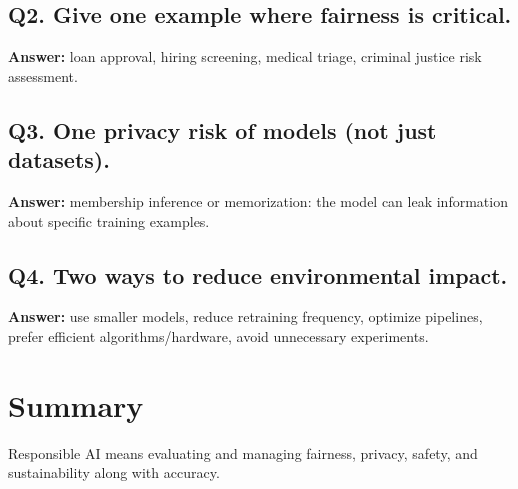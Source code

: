 \documentclass[11pt]{article}
\begin{document}
\subsection*{Q2. Give one example where fairness is critical.}
\textbf{Answer:} loan approval, hiring screening, medical triage, criminal justice risk assessment.

\subsection*{Q3. One privacy risk of models (not just datasets).}
\textbf{Answer:} membership inference or memorization: the model can leak information about specific training examples.

\subsection*{Q4. Two ways to reduce environmental impact.}
\textbf{Answer:} use smaller models, reduce retraining frequency, optimize pipelines, prefer efficient algorithms/hardware, avoid unnecessary experiments.

\section{Summary}
Responsible AI means evaluating and managing fairness, privacy, safety, and sustainability along with accuracy.
\notesources{\AIMLUnitVSources}
\end{document}
